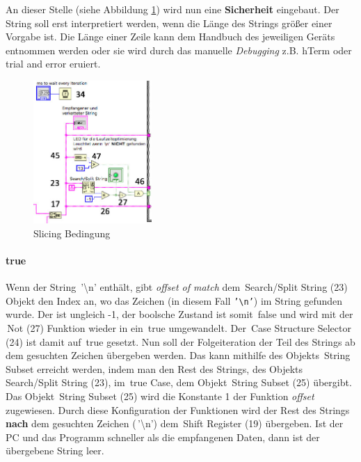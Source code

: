 {\noindent An dieser Stelle (siehe Abbildung \ref{slicing_bedingung}) wird nun eine \textbf{Sicherheit} eingebaut. Der String soll erst interpretiert werden, wenn die Länge des Strings größer einer Vorgabe ist. Die Länge einer Zeile kann dem Handbuch des jeweiligen Geräts entnommen werden oder sie wird durch das manuelle \textit{Debugging} z.B. hTerm oder trial and error eruiert. 


\begin{figure}[h!] 
\centering
\includegraphics[width=0.4\textwidth]{Bilder/LabVIEW_serialport/slicing_bedingung.jpg}
\vspace{2pt}
\caption[Slicing Bedingung]{Slicing Bedingung}\label{slicing_bedingung}
\end{figure}

\paragraph*{true} Wenn der String \,{\Menlo '\textbackslash n'} enthält, gibt \textit{offset of match} dem \,{\Menlo Search/Split String} (23) Objekt den Index an, wo das Zeichen (in diesem Fall \texttt{'\textbackslash n'}) im String gefunden wurde. Der ist ungleich -1, der boolsche Zustand ist somit \,{\Menlo false} und wird mit der \,{\Menlo Not} (27) Funktion wieder in ein \,{\Menlo true} umgewandelt. Der \,{\Menlo Case Structure Selector} (24) ist damit auf \,{\Menlo true} gesetzt. Nun soll der Folgeiteration der Teil des Strings ab dem gesuchten Zeichen übergeben werden. Das kann mithilfe des Objekts \,{\Menlo String Subset} erreicht werden, indem man den Rest des Strings, des Objekts \,{\Menlo Search/Split String} (23), im \,{\Menlo true} Case, dem Objekt \,{\Menlo String Subset} (25) übergibt. Das Objekt \,{\Menlo String Subset} (25) wird die Konstante 1 der Funktion \textit{offset} zugewiesen. Durch diese Konfiguration der Funktionen wird der Rest des Strings \textbf{nach} dem gesuchten Zeichen (\,{\Menlo '\textbackslash n'}) dem \,{\Menlo Shift Register} (19) übergeben. Ist der PC und das Programm schneller als die empfangenen Daten, dann ist der übergebene String leer.

}

